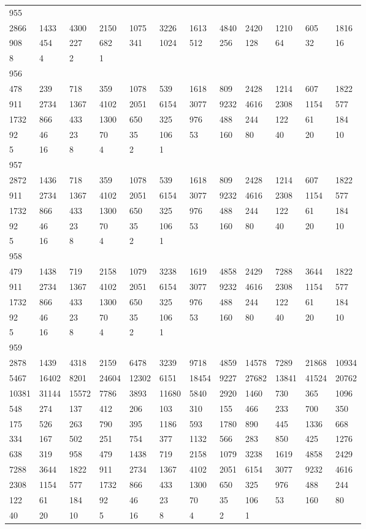 \begin{longtable}{llllllllllll}
955&&&&&&&&&&&\\
2866& 1433& 4300& 2150& 1075& 3226& 1613& 4840& 2420& 1210& 605& 1816\\
908& 454& 227& 682& 341& 1024& 512& 256& 128& 64& 32& 16\\
8& 4& 2& 1& \\

956&&&&&&&&&&&\\
478& 239& 718& 359& 1078& 539& 1618& 809& 2428& 1214& 607& 1822\\
911& 2734& 1367& 4102& 2051& 6154& 3077& 9232& 4616& 2308& 1154& 577\\
1732& 866& 433& 1300& 650& 325& 976& 488& 244& 122& 61& 184\\
92& 46& 23& 70& 35& 106& 53& 160& 80& 40& 20& 10\\
5& 16& 8& 4& 2& 1& \\

957&&&&&&&&&&&\\
2872& 1436& 718& 359& 1078& 539& 1618& 809& 2428& 1214& 607& 1822\\
911& 2734& 1367& 4102& 2051& 6154& 3077& 9232& 4616& 2308& 1154& 577\\
1732& 866& 433& 1300& 650& 325& 976& 488& 244& 122& 61& 184\\
92& 46& 23& 70& 35& 106& 53& 160& 80& 40& 20& 10\\
5& 16& 8& 4& 2& 1& \\

958&&&&&&&&&&&\\
479& 1438& 719& 2158& 1079& 3238& 1619& 4858& 2429& 7288& 3644& 1822\\
911& 2734& 1367& 4102& 2051& 6154& 3077& 9232& 4616& 2308& 1154& 577\\
1732& 866& 433& 1300& 650& 325& 976& 488& 244& 122& 61& 184\\
92& 46& 23& 70& 35& 106& 53& 160& 80& 40& 20& 10\\
5& 16& 8& 4& 2& 1& \\

959&&&&&&&&&&&\\
2878& 1439& 4318& 2159& 6478& 3239& 9718& 4859& 14578& 7289& 21868& 10934\\
5467& 16402& 8201& 24604& 12302& 6151& 18454& 9227& 27682& 13841& 41524& 20762\\
10381& 31144& 15572& 7786& 3893& 11680& 5840& 2920& 1460& 730& 365& 1096\\
548& 274& 137& 412& 206& 103& 310& 155& 466& 233& 700& 350\\
175& 526& 263& 790& 395& 1186& 593& 1780& 890& 445& 1336& 668\\
334& 167& 502& 251& 754& 377& 1132& 566& 283& 850& 425& 1276\\
638& 319& 958& 479& 1438& 719& 2158& 1079& 3238& 1619& 4858& 2429\\
7288& 3644& 1822& 911& 2734& 1367& 4102& 2051& 6154& 3077& 9232& 4616\\
2308& 1154& 577& 1732& 866& 433& 1300& 650& 325& 976& 488& 244\\
122& 61& 184& 92& 46& 23& 70& 35& 106& 53& 160& 80\\
40& 20& 10& 5& 16& 8& 4& 2& 1& \\


\end{longtable}
